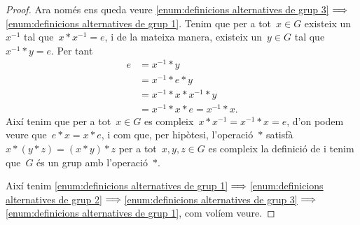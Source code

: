 \documentclass[../../main.tex]{subfiles}
\begin{document}
\begin{theorem}
\begin{proof}
            Ara només ens queda veure \eqref{enum:definicions alternatives de grup 3}\(\implies\)\eqref{enum:definicions alternatives de grup 1}.
            Tenim que per a tot~\(x\in G\) existeix un~\(x^{-1}\) tal que~\(x\ast x^{-1}=e\), i de la mateixa manera, existeix un~\(y\in G\) tal que~\(x^{-1}\ast y=e\).
            Per tant
            \begin{align*}
            e&=x^{-1}\ast y\\
            &=x^{-1}\ast e\ast y\\
            &=x^{-1}\ast x\ast x^{-1}\ast y\\
            &=x^{-1}\ast x\ast e=x^{-1}\ast x.
            \end{align*}
            Així tenim que per a tot~\(x\in G\) es compleix~\(x\ast x^{-1}=x^{-1}\ast x=e\), d'on podem veure que~\(e\ast x=x\ast e\), i com que, per hipòtesi, l'operació~\(\ast\) satisfà~\(x\ast(y\ast z)=(x\ast y)\ast z\) per a tot~\(x,y,z\in G\) es compleix la definició de  i tenim que~\(G\) és un grup amb l'operació~\(\ast\).

            Així tenim \eqref{enum:definicions alternatives de grup 1}\(\implies\)\eqref{enum:definicions alternatives de grup 2}\(\implies\)\eqref{enum:definicions alternatives de grup 3}\(\implies\)\eqref{enum:definicions alternatives de grup 1}, com volíem veure.
        \end{proof}
    \end{theorem}
\end{document}

